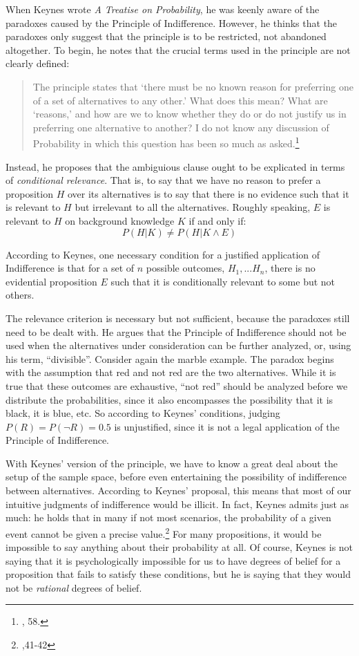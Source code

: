 When Keynes wrote \emph{A Treatise on Probability}, he was keenly aware
of the paradoxes caused by the Principle of Indifference. However, he
thinks that the paradoxes only suggest that the principle is to be
restricted, not abandoned altogether. To begin, he notes that the
crucial terms used in the principle are not clearly defined:

\begin{quote}
The principle states that `there must be no known reason for preferring
one of a set of alternatives to any other.' What does this mean? What
are `reasons,' and how are we to know whether they do or do not justify
us in preferring one alternative to another? I do not know any
discussion of Probability in which this question has been so much as
asked.\footnote{\cite{keynes}, 58.}
\end{quote}

Instead, he proposes that the ambiguious clause ought to be explicated in terms of
\emph{conditional relevance}. That is, to say that we have no reason to prefer
a proposition \(H\) over its alternatives is to say that there is no
evidence such that it is relevant to \(H\) but irrelevant to all the
alternatives. Roughly speaking, \(E\) is relevant to \(H\) on background
knowledge \(K\) if and only if: \[P(H|K) \neq P(H|K\wedge E)\]

According to Keynes, one necessary condition for a justified application
of Indifference is that for a set of \(n\) possible outcomes,
\(H_1,...H_n\), there is no evidential proposition \(E\) such that it is
conditionally relevant to some but not others.

The relevance criterion is necessary but not sufficient, because the
paradoxes still need to be dealt with. He argues that the Principle of
Indifference should not be used when the alternatives under
consideration can be further analyzed, or, using his term,
``divisible''. Consider again the marble example. The paradox begins
with the assumption that red and not red are the two alternatives. While
it is true that these outcomes are exhaustive, ``not red'' should be
analyzed before we distribute the probabilities, since it also
encompasses the possibility that it is black, it is blue, etc. So
according to Keynes' conditions, judging \(P(R) = P(\neg R) = 0.5\) is
unjustified, since it is not a legal application of the Principle of
Indifference.

With Keynes' version of the principle, we have to know a great deal
about the setup of the sample space, before even entertaining the
possibility of indifference between alternatives. According to Keynes'
proposal, this means that most of our intuitive judgments of
indifference would be illicit. In fact, Keynes admits just as much: he
holds that in many if not most scenarios, the probability of a given
event cannot be given a precise value.\footnote{\cite{keynes},41-42} For many propositions, it would
be impossible to say anything about their probability at all. Of course,
Keynes is not saying that it is psychologically impossible for us to
have degrees of belief for a proposition that fails to satisfy these
conditions, but he is saying that they would not be \emph{rational}
degrees of belief.

